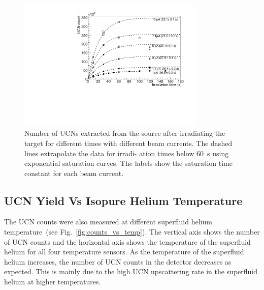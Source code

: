 \begin{figure}[h!]
  \centering
  \includegraphics[width=0.8\textwidth]{UCNCounts_vs_irradTime.pdf}
  \caption{Number of UCNs extracted from the source after irradiating
    the target for different times with different beam currents. The
    dashed lines extrapolate the data for irradi- ation times below
    60~s using exponential saturation curves.  The labels show the
    saturation time constant for each beam current. }
  \label{fig:counts_vs_irrad}
\end{figure}


\subsection{UCN Yield Vs Isopure Helium Temperature}
The UCN counts were also measured at different superfluid helium
temperature~(see Fig.~\ref{fig:counts_vs_temp}). The vertical axis
shows the number of UCN counts and the horizontal axis shows the
temperature of the superfluid helium for all four temperature
sensors. As the temperature of the superfluid helium increases, the
number of UCN counts in the detector decreases as expected. This is
mainly due to the high UCN upscattering rate in the superfluid helium
at higher temperatures.


